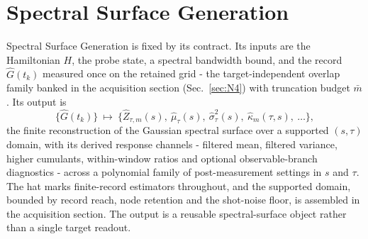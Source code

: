 \section{Spectral Surface Generation}\label{sec:N3}

Spectral Surface Generation is fixed by its contract. Its inputs are the Hamiltonian $H$, the probe state, a spectral bandwidth bound, and the record $\widehat G(t_k)$ measured once on the retained grid - the target-independent overlap family banked in the acquisition section (Sec.~\ref{sec:N4}) with truncation budget $\bar m$. Its output is
\begin{equation}\label{def:protocol-output-specification}
\bigl\{\widehat G(t_k)\bigr\}\ \longmapsto\ \bigl\{\widehat Z_{\tau,m}(s),\ \widehat\mu_\tau(s),\ \widehat\sigma_\tau^{2}(s),\ \widehat\kappa_m(\tau,s),\ \dots\bigr\},
\end{equation}
the finite reconstruction of the Gaussian spectral surface over a supported $(s,\tau)$ domain, with its derived response channels - filtered mean, filtered variance, higher cumulants, within-window ratios and optional observable-branch diagnostics - across a polynomial family of post-measurement settings in $s$ and $\tau$. The hat marks finite-record estimators throughout, and the supported domain, bounded by record reach, node retention and the shot-noise floor, is assembled in the acquisition section. The output is a reusable spectral-surface object rather than a single target readout.

